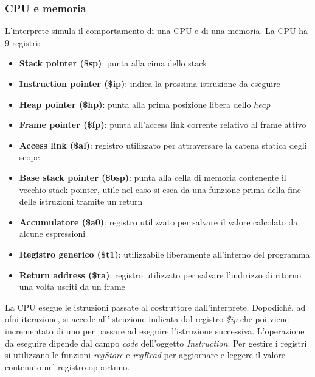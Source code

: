 \documentclass[../../main]{subfiles}
\begin{document}
\subsubsection{CPU e memoria}
L'interprete simula il comportamento di una CPU e di una memoria.
La CPU ha 9 registri: 
\begin{itemize}
    \item \textbf{Stack pointer (\$sp)}: punta alla cima dello stack
    \item \textbf{Instruction pointer (\$ip)}: indica la prossima istruzione da eseguire
    \item \textbf{Heap pointer (\$hp)}: punta alla prima posizione libera dello \emph{heap}
    \item \textbf{Frame pointer (\$fp)}: punta all'access link corrente relativo al frame attivo
    \item \textbf{Access link (\$al)}: registro utilizzato per attraversare la catena statica degli scope
    \item \textbf{Base stack pointer (\$bsp)}: punta alla cella di memoria contenente il vecchio stack pointer, utile nel caso si esca da una funzione prima della fine delle istruzioni tramite un return
    \item \textbf{Accumulatore (\$a0)}: registro utilizzato per salvare il valore calcolato da alcune espressioni
    \item \textbf{Registro generico (\$t1)}: utilizzabile liberamente all'interno del programma  
    \item \textbf{Return address (\$ra)}: registro utilizzato per salvare l'indirizzo di ritorno una volta usciti da un frame
\end{itemize}
La CPU esegue le istruzioni passate al costruttore dall'interprete. Dopodiché, ad ofni iterazione, si accede all'istruzione indicata dal registro \emph{\$ip} che poi viene incrementato di uno per passare ad eseguire l'istruzione successiva. L'operazione da eseguire dipende dal campo \emph{code} dell'oggetto \emph{Instruction}.  
\newline
Per gestire i registri si utilizzano le funzioni \emph{regStore} e \emph{regRead} per aggiornare e leggere il valore contenuto nel registro opportuno.
\end{document}
